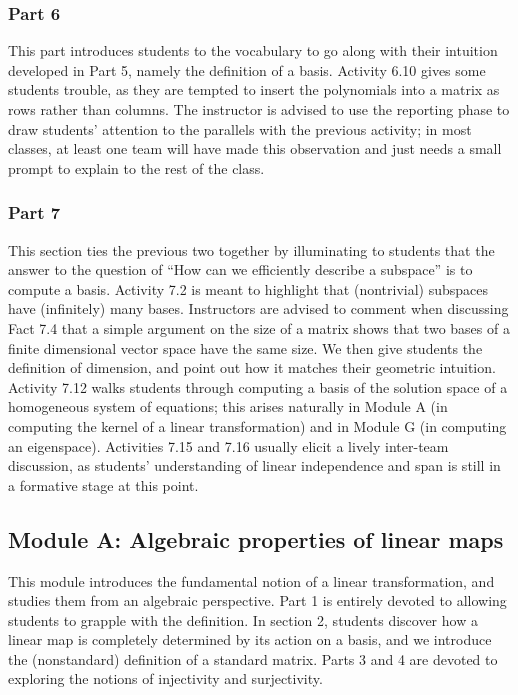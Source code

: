 \documentclass{article}
\begin{document}
\subsubsection*{Part 6}
This part introduces students to the vocabulary to go along with their intuition developed in Part 5, namely the definition of a basis.  Activity 6.10 gives some students trouble, as they are tempted to insert the polynomials into a matrix as rows rather than columns.  The instructor is advised to use the reporting phase to draw students' attention to the parallels with the previous activity; in most classes, at least one team will have made this observation and just needs a small prompt to explain to the rest of the class.  

\subsubsection*{Part 7}
This section ties the previous two together by illuminating to students that the answer to the question of ``How can we efficiently describe a subspace'' is to compute a basis.  Activity 7.2 is meant to highlight that (nontrivial) subspaces have (infinitely) many bases.  Instructors are advised to comment when discussing Fact 7.4 that a simple argument on the size of a matrix shows that two bases of a finite dimensional vector space have the same size.  We then give students the definition of dimension, and point out how it matches their geometric intuition.  Activity 7.12 walks students through computing a basis of the solution space of a homogeneous system of equations; this arises naturally in Module A (in computing the kernel of a linear transformation) and in Module G (in computing an eigenspace).  Activities 7.15 and 7.16 usually elicit a lively inter-team discussion, as students' understanding of linear independence and span is still in a formative stage at this point.


\subsection*{Module A: Algebraic properties of linear maps}
This module introduces the fundamental notion of a linear transformation, and studies them from an algebraic perspective.   Part 1 is entirely devoted to allowing students to grapple with the definition.  In section 2, students discover how a linear map is completely determined by its action on a basis, and we introduce the (nonstandard) definition of a standard matrix.  Parts 3 and 4 are devoted to exploring the notions of injectivity and surjectivity.
\end{document}

